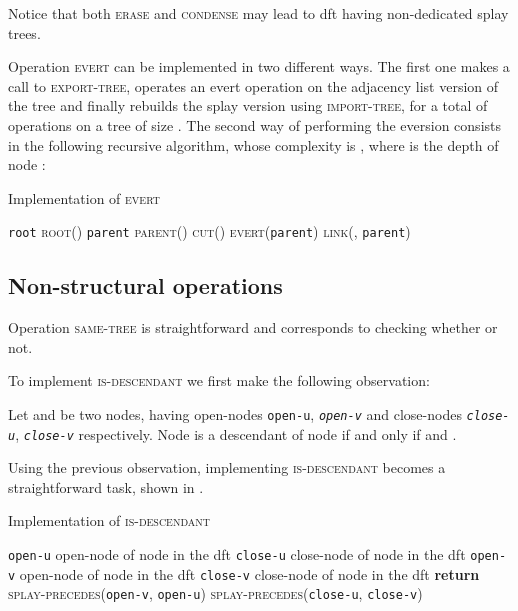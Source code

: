 \documentclass[a4paper,USenglish]{lipics}
\newcommand{\var}[1]{\textrm{\texttt{#1}}}
\begin{document}
Notice that both \textsc{erase} and \textsc{condense} may lead to dft having non-dedicated splay trees.
		
		Operation \textsc{evert} can be implemented in two different ways. The first one makes a call to \textsc{export-tree}, operates an  evert operation on the adjacency list version of the tree and finally rebuilds the splay version using \textsc{import-tree}, for a total of  operations on a tree of size . The second way of performing the eversion consists in the following recursive algorithm, whose complexity is , where  is the depth of node :
		\begin{algorithm}[H]
		  \small
		  \caption{\small Implementation of \textsc{evert}}
		  \begin{algorithmic}[1]
		    \State \var{root}  \textsc{root}()
			\If{}
				\State \var{parent}  \textsc{parent}()
				\State \textsc{cut}()
				\State \textsc{evert}(\var{parent})
				\State \textsc{link}(, \var{parent})
			\EndIf
		    \EndProcedure
		  \end{algorithmic}
		\end{algorithm}		
		
		\subsection{Non-structural operations}
		Operation \textsc{same-tree} is straightforward and corresponds to checking whether  or not.
		
		To implement \textsc{is-descendant} we first make the following observation:
		\begin{lemma}
			\item Let  and  be two nodes, having open-nodes {\var{open-u}}, \emph{\var{open-v}} and close-nodes \emph{\var{close-u}}, \emph{\var{close-v}} respectively. Node  is a descendant of node  if and only if  and .
		\end{lemma}
		Using the previous observation, implementing \textsc{is-descendant} becomes a straightforward task, shown in .
		\begin{algorithm}[H]
		  \small
		  \caption{\small Implementation of \textsc{is-descendant}}
		  \label{algo:is descendant}
		  \begin{algorithmic}[1]
			    \State \var{open-u}  open-node of node  in the dft
			    \State \var{close-u}  close-node of node  in the dft
			    \State \var{open-v}  open-node of node  in the dft
			    \State \var{close-v}  close-node of node  in the dft
			    \State \textbf{return} \textsc{splay-precedes}(\var{open-v}, \var{open-u})  \textsc{splay-precedes}(\var{close-u}, \var{close-v})
		    \EndProcedure
		  \end{algorithmic}
		\end{algorithm}
		
\end{document}
